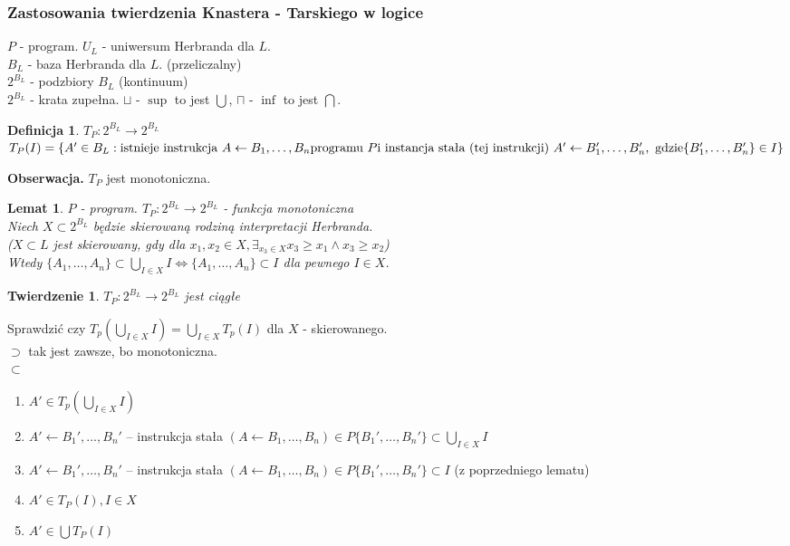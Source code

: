 \documentclass[10pt,a4paper]{article}
\theoremstyle{plain}
\newtheorem{theorem}{Twierdzenie}
\newtheorem{lemma}{Lemat}
\theoremstyle{definition}
\newtheorem*{definition}{Definicja}
\newcommand{\header}[1]{\noindent\textbf{#1}}
\begin{document}
\subsubsection{Zastosowania twierdzenia Knastera - Tarskiego w logice}
$P$ - program. $U_L$ - uniwersum Herbranda dla  $L$.\\
$B_L$ - baza Herbranda dla $L$. (przeliczalny)\\
$2^{B_L}$ - podzbiory $B_L$ (kontinuum)\\
$2^{B_L}$ - krata zupełna. $\sqcup$ - $\sup$ to jest $\bigcup$, $\sqcap$ - $\inf$ to jest $\bigcap$.\\
\begin{definition}
  $T_P : 2^{B_L} \rightarrow 2^{B_L}$
  $T_P(I) = \{A'\in B_L :
    \text{istnieje instrukcja } A\leftarrow B_1, \ldots, B_n \text{programu } P \\
  \text{i instancja stała (tej instrukcji) } A'\leftarrow B_1', \ldots, B_n', \text{ gdzie} \\
  \{B_1', \ldots, B_n' \} \in I \}$

\end{definition}
\header{Obserwacja.} $T_P$ jest monotoniczna.\\
\begin{lemma}
$P$ - program. $T_P : 2^{B_L} \rightarrow 2^{B_L}$ - funkcja monotoniczna\\
Niech $X \subset 2^{B_L}$ będzie skierowaną rodziną interpretacji Herbranda.\\
($X \subset L$ jest skierowany, gdy dla $x_1, x_2 \in X, \exists_{x_3\in X} x_3
\geq x_1 \wedge x_3 \geq x_2$)\\
Wtedy $\{A_1, \ldots, A_n\} \subset \bigcup_{I\in X} I \iff
\{A_1, \ldots, A_n \} \subset I$ dla pewnego $I\in X$.
\end{lemma}

\begin{theorem}
  $T_P : 2^{B_L} \rightarrow 2^{B_L}$ jest ciągłe
\end{theorem}
Sprawdzić czy $T_p(\bigcup_{I\in X} I) = \bigcup_{I\in X}T_p(I)$ dla $X$ - skierowanego.\\
$\supset$ tak jest zawsze, bo monotoniczna.\\
$\subset$
\begin{enumerate}
\item $A' \in T_p(\bigcup_{I\in X} I)$
\item $A' \leftarrow B_1', \ldots, B_n'$ -- instrukcja stała $(A \leftarrow B_1, \ldots, B_n) \in P \{B_1', \ldots, B_n' \} \subset \bigcup_{I\in X} I$
\item $A' \leftarrow B_1', \ldots, B_n'$ -- instrukcja stała $(A \leftarrow B_1, \ldots, B_n) \in P \{B_1', \ldots, B_n' \} \subset I$ (z poprzedniego lematu)
\item $A' \in T_P(I), I\in X$
\item $A' \in \bigcup T_P(I)$
\end{enumerate}
\end{document}
